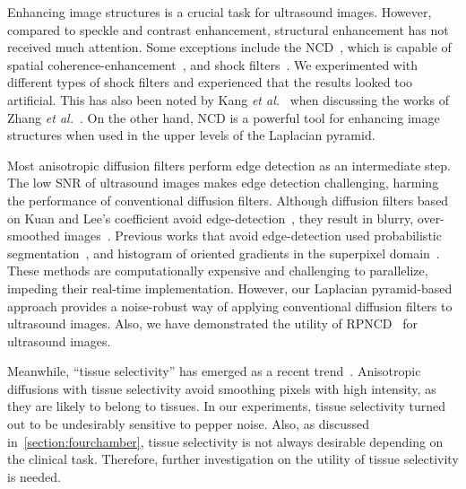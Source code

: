 Enhancing image structures is a crucial task for ultrasound images.
However, compared to speckle and contrast enhancement, structural enhancement has not received much attention.
Some exceptions include the NCD~\cite{abd-elmoniem_realtime_2002}, which is capable of spatial coherence-enhancement~\cite{weickert_coherenceenhancing_1999}, and shock filters~\cite{zhang_multiscale_2006, kang_new_2016}.
We experimented with different types of shock filters and experienced that the results looked too artificial.
This has also been noted by Kang \textit{et al.}~\cite{kang_new_2016} when discussing the works of Zhang \textit{et al.}~\cite{zhang_multiscale_2006}.
On the other hand, NCD is a powerful tool for enhancing image structures when used in the upper levels of the Laplacian pyramid.

Most anisotropic diffusion filters perform edge detection as an intermediate step.
The low SNR of ultrasound images makes edge detection challenging, harming the performance of conventional diffusion filters.
Although diffusion filters based on Kuan and Lee's coefficient avoid edge-detection~\cite{yongjianyu_speckle_2002, aja-fernandez_estimation_2006, krissian_oriented_2007}, they result in blurry, over-smoothed images~\cite{ramos-llorden_anisotropic_2015, mishra_edge_2018}.
Previous works that avoid edge-detection used probabilistic segmentation~\cite{vegas-sanchez-ferrero_probabilisticdriven_2010, ramos-llorden_anisotropic_2015}, and histogram of oriented gradients in the superpixel domain~\cite{mishra_edge_2018}.
These methods are computationally expensive and challenging to parallelize, impeding their real-time implementation.
However, our Laplacian pyramid-based approach provides a noise-robust way of applying conventional diffusion filters to ultrasound images.
Also, we have demonstrated the utility of RPNCD~\cite{gilboa_image_2004} for ultrasound images.

Meanwhile, ``tissue selectivity'' has emerged as a recent trend~\cite{ramos-llorden_anisotropic_2015, mishra_edge_2018}.
Anisotropic diffusions with tissue selectivity avoid smoothing pixels with high intensity, as they are likely to belong to tissues.
In our experiments, tissue selectivity turned out to be undesirably sensitive to pepper noise.
Also, as discussed in~\cref{section:fourchamber}, tissue selectivity is not always desirable depending on the clinical task.
Therefore, further investigation on the utility of tissue selectivity is needed.




